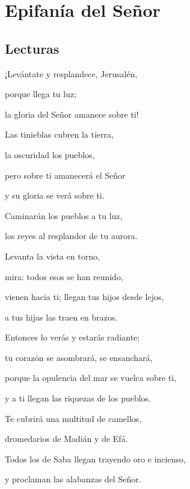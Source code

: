 \chapter{Epifanía del Señor}

	\section{Lecturas}
	
		
		 
		
		
		\begin{scripture}
			¡Levántate y resplandece, Jerusalén,
			
			porque llega tu luz;
			
			la gloria del Señor amanece sobre ti!
			
			Las tinieblas cubren la tierra,
			
			la oscuridad los pueblos,
			
			pero sobre ti amanecerá el Señor
			
			y su gloria se verá sobre ti.
			
			Caminarán los pueblos a tu luz,
			
			los reyes al resplandor de tu aurora.
			
			Levanta la vista en torno,
			
			mira: todos esos se han reunido,
			
			vienen hacia ti; llegan tus hijos desde lejos,
			
			a tus hijas las traen en brazos.
			
			Entonces lo verás y estarás radiante;
			
			tu corazón se asombrará, se ensanchará,
			
			porque la opulencia del mar se vuelca sobre ti,
			
			y a ti llegan las riquezas de los pueblos.
			
			Te cubrirá una multitud de camellos,
			
			dromedarios de Madián y de Efá.
			
			Todos los de Saba llegan trayendo oro e incienso,
			
			y proclaman las alabanzas del Señor.
		\end{scripture}
	
		
